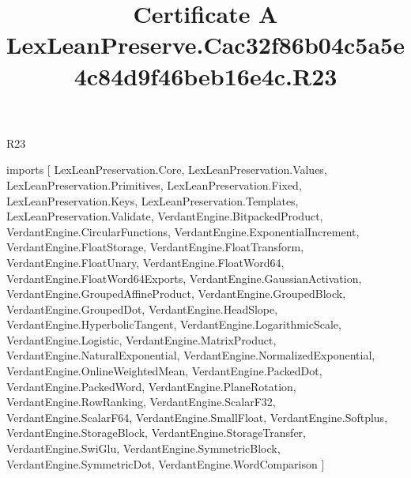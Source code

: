 \begin{lexlean}{R23}
\title{Certificate A LexLeanPreserve.Cac32f86b04c5a5e4c84d9f46beb16e4c.R23}
\begin{coremodule}
imports [
  LexLeanPreservation.Core,
  LexLeanPreservation.Values,
  LexLeanPreservation.Primitives,
  LexLeanPreservation.Fixed,
  LexLeanPreservation.Keys,
  LexLeanPreservation.Templates,
  LexLeanPreservation.Validate,
  VerdantEngine.BitpackedProduct,
  VerdantEngine.CircularFunctions,
  VerdantEngine.ExponentialIncrement,
  VerdantEngine.FloatStorage,
  VerdantEngine.FloatTransform,
  VerdantEngine.FloatUnary,
  VerdantEngine.FloatWord64,
  VerdantEngine.FloatWord64Exports,
  VerdantEngine.GaussianActivation,
  VerdantEngine.GroupedAffineProduct,
  VerdantEngine.GroupedBlock,
  VerdantEngine.GroupedDot,
  VerdantEngine.HeadSlope,
  VerdantEngine.HyperbolicTangent,
  VerdantEngine.LogarithmicScale,
  VerdantEngine.Logistic,
  VerdantEngine.MatrixProduct,
  VerdantEngine.NaturalExponential,
  VerdantEngine.NormalizedExponential,
  VerdantEngine.OnlineWeightedMean,
  VerdantEngine.PackedDot,
  VerdantEngine.PackedWord,
  VerdantEngine.PlaneRotation,
  VerdantEngine.RowRanking,
  VerdantEngine.ScalarF32,
  VerdantEngine.ScalarF64,
  VerdantEngine.SmallFloat,
  VerdantEngine.Softplus,
  VerdantEngine.StorageBlock,
  VerdantEngine.StorageTransfer,
  VerdantEngine.SwiGlu,
  VerdantEngine.SymmetricBlock,
  VerdantEngine.SymmetricDot,
  VerdantEngine.WordComparison
]


\end{coremodule}
\end{lexlean}
